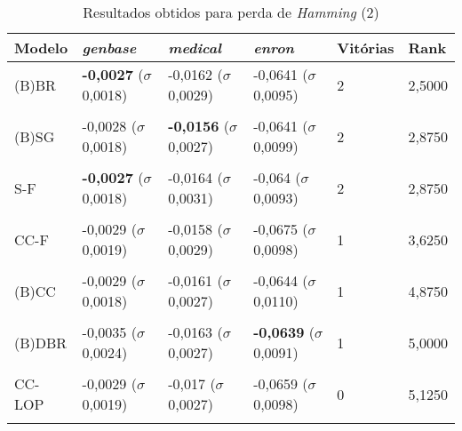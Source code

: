 \begin{table}[htbp]
	\centering
	\caption{Resultados obtidos para perda de \textit{{Hamming}} (2)}
		\begin{tabular}
        { p{0.88in} p{0.88in} p{0.88in} p{0.88in} p{0.88in} p{0.88in} }
        
        \hline
Modelo & \textit{genbase} & \textit{medical} & \textit{enron} & \textbf{Vitórias} & \textbf{Rank} \\ 
\hline

(B)BR & \textbf{-0,0027} \newline ($\sigma$ 0,0018) & -0,0162 \newline ($\sigma$ 0,0029) & -0,0641 \newline ($\sigma$ 0,0095) & 2 & 2,5000 \\ \\
(B)SG & -0,0028 \newline ($\sigma$ 0,0018) & \textbf{-0,0156} \newline ($\sigma$ 0,0027) & -0,0641 \newline ($\sigma$ 0,0099) & 2 & 2,8750 \\ \\
S-F & \textbf{-0,0027} \newline ($\sigma$ 0,0018) & -0,0164 \newline ($\sigma$ 0,0031) & -0,064 \newline ($\sigma$ 0,0093) & 2 & 2,8750 \\ \\
CC-F & -0,0029 \newline ($\sigma$ 0,0019) & -0,0158 \newline ($\sigma$ 0,0029) & -0,0675 \newline ($\sigma$ 0,0098) & 1 & 3,6250 \\ \\
(B)CC & -0,0029 \newline ($\sigma$ 0,0018) & -0,0161 \newline ($\sigma$ 0,0027) & -0,0644 \newline ($\sigma$ 0,0110) & 1 & 4,8750 \\ \\
(B)DBR & -0,0035 \newline ($\sigma$ 0,0024) & -0,0163 \newline ($\sigma$ 0,0027) & \textbf{-0,0639} \newline ($\sigma$ 0,0091) & 1 & 5,0000 \\ \\
CC-LOP & -0,0029 \newline ($\sigma$ 0,0019) & -0,017 \newline ($\sigma$ 0,0027) & -0,0659 \newline ($\sigma$ 0,0098) & 0 & 5,1250 \\ \\

        \hline
        \end{tabular}
	\label{tab:metricsForhamming_loss_2}
\end{table}

